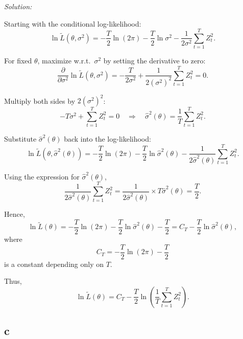 \documentclass{article}
\begin{document}
\medskip

\textit{Solution:}

Starting with the conditional log-likelihood:
\[
\ln \tilde{L}(\theta, \sigma^2) = -\frac{T}{2} \ln(2\pi) - \frac{T}{2} \ln \sigma^2 - \frac{1}{2\sigma^2} \sum_{t=1}^T Z_t^2.
\]

For fixed \(\theta\), maximize w.r.t.\ \(\sigma^2\) by setting the derivative to zero:
\[
\frac{\partial}{\partial \sigma^2} \ln \tilde{L}(\theta, \sigma^2) = -\frac{T}{2\sigma^2} + \frac{1}{2 (\sigma^2)^2} \sum_{t=1}^T Z_t^2 = 0.
\]

Multiply both sides by \(2 (\sigma^2)^2\):
\[
- T \sigma^2 + \sum_{t=1}^T Z_t^2 = 0 \quad \Rightarrow \quad \hat{\sigma}^2(\theta) = \frac{1}{T} \sum_{t=1}^T Z_t^2.
\]

Substitute \(\hat{\sigma}^2(\theta)\) back into the log-likelihood:
\[
\ln \tilde{L}(\theta, \hat{\sigma}^2(\theta)) = -\frac{T}{2} \ln(2\pi) - \frac{T}{2} \ln \hat{\sigma}^2(\theta) - \frac{1}{2 \hat{\sigma}^2(\theta)} \sum_{t=1}^T Z_t^2.
\]

Using the expression for \(\hat{\sigma}^2(\theta)\),
\[
\frac{1}{2 \hat{\sigma}^2(\theta)} \sum_{t=1}^T Z_t^2 = \frac{1}{2 \hat{\sigma}^2(\theta)} \times T \hat{\sigma}^2(\theta) = \frac{T}{2}.
\]

Hence,
\[
\ln \tilde{L}(\theta) = -\frac{T}{2} \ln(2\pi) - \frac{T}{2} \ln \hat{\sigma}^2(\theta) - \frac{T}{2} = C_T - \frac{T}{2} \ln \hat{\sigma}^2(\theta),
\]
where
\[
C_T = -\frac{T}{2} \ln(2\pi) - \frac{T}{2}
\]
is a constant depending only on \(T\).

Thus,
\[
\boxed{
\ln \tilde{L}(\theta) = C_T - \frac{T}{2} \ln \left( \frac{1}{T} \sum_{t=1}^T Z_t^2 \right).
}
\]
\subsection{c}
\end{document}
